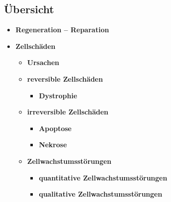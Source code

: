 \subsection{Übersicht}
	\begin{itemize}
		\item \textbf{Regeneration – Reparation}
		\item \textbf{Zellschäden}
			\begin{itemize}
				\item \textbf{Ursachen}
				\item \textbf{reversible Zellschäden}
					\begin{itemize}
						\item \textbf{Dystrophie}
					\end{itemize}
				\item \textbf{irreversible Zellschäden}
					\begin{itemize}
						\item \textbf{Apoptose}
						\item \textbf{Nekrose}
					\end{itemize}
				\item \textbf{Zellwachstumsstörungen}
					\begin{itemize}
						\item \textbf{quantitative Zellwachstumsstörungen}
						\item \textbf{qualitative Zellwachstumsstörungen}
					\end{itemize}
			\end{itemize}
	\end{itemize}

